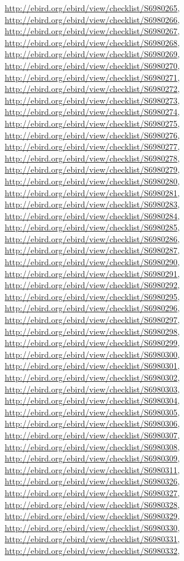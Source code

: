 \documentclass[9pt, article]{memoir}
\begin{document}
\begin{multicols}{2}
\url{http://ebird.org/ebird/view/checklist/S6980265}, 
\url{http://ebird.org/ebird/view/checklist/S6980266}, 
\url{http://ebird.org/ebird/view/checklist/S6980267}, 
\url{http://ebird.org/ebird/view/checklist/S6980268}, 
\url{http://ebird.org/ebird/view/checklist/S6980269}, 
\url{http://ebird.org/ebird/view/checklist/S6980270}, 
\url{http://ebird.org/ebird/view/checklist/S6980271}, 
\url{http://ebird.org/ebird/view/checklist/S6980272}, 
\url{http://ebird.org/ebird/view/checklist/S6980273}, 
\url{http://ebird.org/ebird/view/checklist/S6980274}, 
\url{http://ebird.org/ebird/view/checklist/S6980275}, 
\url{http://ebird.org/ebird/view/checklist/S6980276}, 
\url{http://ebird.org/ebird/view/checklist/S6980277}, 
\url{http://ebird.org/ebird/view/checklist/S6980278}, 
\url{http://ebird.org/ebird/view/checklist/S6980279}, 
\url{http://ebird.org/ebird/view/checklist/S6980280}, 
\url{http://ebird.org/ebird/view/checklist/S6980281}, 
\url{http://ebird.org/ebird/view/checklist/S6980283}, 
\url{http://ebird.org/ebird/view/checklist/S6980284}, 
\url{http://ebird.org/ebird/view/checklist/S6980285}, 
\url{http://ebird.org/ebird/view/checklist/S6980286}, 
\url{http://ebird.org/ebird/view/checklist/S6980287}, 
\url{http://ebird.org/ebird/view/checklist/S6980290}, 
\url{http://ebird.org/ebird/view/checklist/S6980291}, 
\url{http://ebird.org/ebird/view/checklist/S6980292}, 
\url{http://ebird.org/ebird/view/checklist/S6980295}, 
\url{http://ebird.org/ebird/view/checklist/S6980296}, 
\url{http://ebird.org/ebird/view/checklist/S6980297}, 
\url{http://ebird.org/ebird/view/checklist/S6980298}, 
\url{http://ebird.org/ebird/view/checklist/S6980299}, 
\url{http://ebird.org/ebird/view/checklist/S6980300}, 
\url{http://ebird.org/ebird/view/checklist/S6980301}, 
\url{http://ebird.org/ebird/view/checklist/S6980302}, 
\url{http://ebird.org/ebird/view/checklist/S6980303}, 
\url{http://ebird.org/ebird/view/checklist/S6980304}, 
\url{http://ebird.org/ebird/view/checklist/S6980305}, 
\url{http://ebird.org/ebird/view/checklist/S6980306}, 
\url{http://ebird.org/ebird/view/checklist/S6980307}, 
\url{http://ebird.org/ebird/view/checklist/S6980308}, 
\url{http://ebird.org/ebird/view/checklist/S6980309}, 
\url{http://ebird.org/ebird/view/checklist/S6980311}, 
\url{http://ebird.org/ebird/view/checklist/S6980326}, 
\url{http://ebird.org/ebird/view/checklist/S6980327}, 
\url{http://ebird.org/ebird/view/checklist/S6980328}, 
\url{http://ebird.org/ebird/view/checklist/S6980329}, 
\url{http://ebird.org/ebird/view/checklist/S6980330}, 
\url{http://ebird.org/ebird/view/checklist/S6980331}, 
\url{http://ebird.org/ebird/view/checklist/S6980332}, 

\end{multicols}
\end{document}
